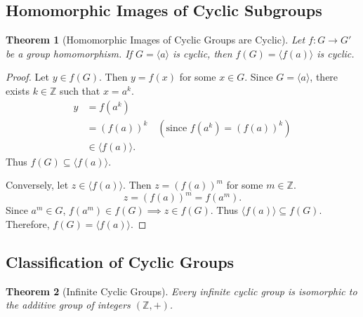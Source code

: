 \documentclass[12pt]{article}
\theoremstyle{definition}
\theoremstyle{plain}
\newtheorem{theorem}{Theorem}[section]
\begin{document}
\subsection{Homomorphic Images of Cyclic Subgroups}

\begin{theorem}[Homomorphic Images of Cyclic Groups are Cyclic]
Let $f: G \longrightarrow G'$ be a group homomorphism.
If $G = \langle a \rangle$ is cyclic, then $f(G) = \langle f(a) \rangle$ is cyclic.
\end{theorem}

\begin{proof}
Let $y \in f(G)$. Then $y = f(x)$ for some $x \in G$.
Since $G = \langle a \rangle$, there exists $k \in \mathbb{Z}$ such that $x = a^k$.
\begin{align*}
    y &= f(a^k) \\
    &= (f(a))^k \quad (\text{since } f(a^k) = (f(a))^k) \\
    &\in \langle f(a) \rangle.
\end{align*}
Thus $f(G) \subseteq \langle f(a) \rangle$.

Conversely, let $z \in \langle f(a) \rangle$. Then $z = (f(a))^m$ for some $m \in \mathbb{Z}$.
\[
z = (f(a))^m = f(a^m).
\]
Since $a^m \in G$, $f(a^m) \in f(G) \implies z \in f(G)$.
Thus $\langle f(a) \rangle \subseteq f(G)$.
Therefore, $\boxed{f(G) = \langle f(a) \rangle}$.
\end{proof}

\subsection{Classification of Cyclic Groups}

\begin{theorem}[Infinite Cyclic Groups]
Every infinite cyclic group is isomorphic to the additive group of integers $(\mathbb{Z}, +)$.
\end{theorem}
\end{document}
